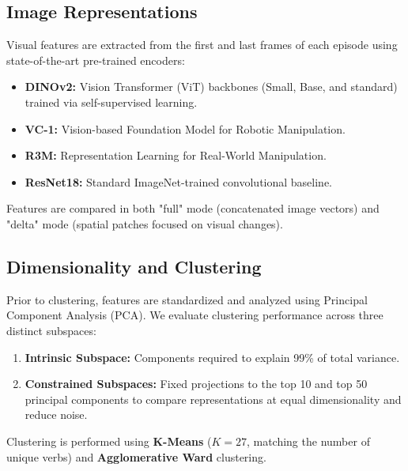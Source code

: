 \documentclass{article}
\begin{document}
\subsection{Image Representations}
Visual features are extracted from the first and last frames of each episode using state-of-the-art pre-trained encoders:
\begin{itemize}
    \item \textbf{DINOv2:} Vision Transformer (ViT) backbones (Small, Base, and standard) trained via self-supervised learning.
    \item \textbf{VC-1:} Vision-based Foundation Model for Robotic Manipulation.
    \item \textbf{R3M:} Representation Learning for Real-World Manipulation.
    \item \textbf{ResNet18:} Standard ImageNet-trained convolutional baseline.
\end{itemize}
Features are compared in both "full" mode (concatenated image vectors) and "delta" mode (spatial patches focused on visual changes).

\subsection{Dimensionality and Clustering}
Prior to clustering, features are standardized and analyzed using Principal Component Analysis (PCA). We evaluate clustering performance across three distinct subspaces:
\begin{enumerate}
    \item \textbf{Intrinsic Subspace:} Components required to explain 99\% of total variance.
    \item \textbf{Constrained Subspaces:} Fixed projections to the top 10 and top 50 principal components to compare representations at equal dimensionality and reduce noise.
\end{enumerate}
Clustering is performed using \textbf{K-Means} ($K=27$, matching the number of unique verbs) and \textbf{Agglomerative Ward} clustering.
\end{document}
